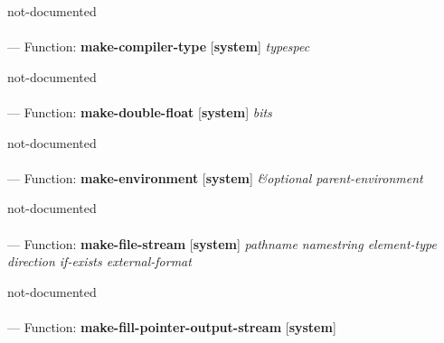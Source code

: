 \begin{adjustwidth}{5em}{5em}
not-documented
\end{adjustwidth}

\paragraph{}
\label{SYSTEM:MAKE-COMPILER-TYPE}
--- Function: \textbf{make-compiler-type} [\textbf{system}] \textit{typespec}

\begin{adjustwidth}{5em}{5em}
not-documented
\end{adjustwidth}

\paragraph{}
\label{SYSTEM:MAKE-DOUBLE-FLOAT}
--- Function: \textbf{make-double-float} [\textbf{system}] \textit{bits}

\begin{adjustwidth}{5em}{5em}
not-documented
\end{adjustwidth}

\paragraph{}
\label{SYSTEM:MAKE-ENVIRONMENT}
--- Function: \textbf{make-environment} [\textbf{system}] \textit{\&optional parent-environment}

\begin{adjustwidth}{5em}{5em}
not-documented
\end{adjustwidth}

\paragraph{}
\label{SYSTEM:MAKE-FILE-STREAM}
--- Function: \textbf{make-file-stream} [\textbf{system}] \textit{pathname namestring element-type direction if-exists external-format}

\begin{adjustwidth}{5em}{5em}
not-documented
\end{adjustwidth}

\paragraph{}
\label{SYSTEM:MAKE-FILL-POINTER-OUTPUT-STREAM}
--- Function: \textbf{make-fill-pointer-output-stream} [\textbf{system}] \textit{}

